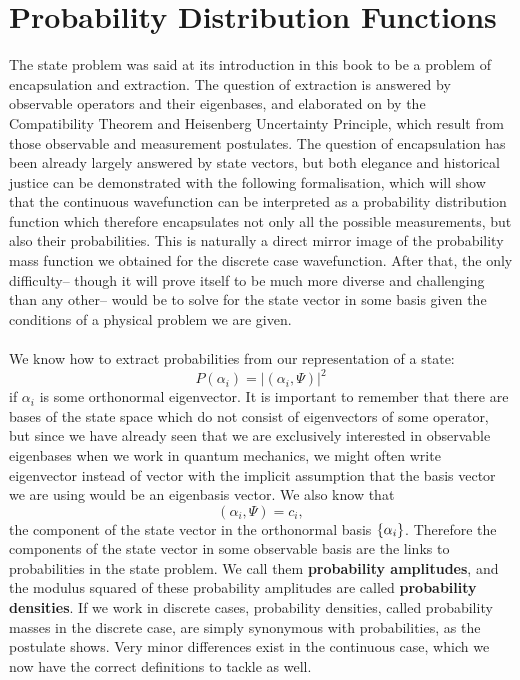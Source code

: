 \section{Probability Distribution Functions}
The state problem was said at its introduction in this book to be a problem of encapsulation and extraction. The question of extraction is answered by observable operators and their eigenbases, and elaborated on by the Compatibility Theorem and Heisenberg Uncertainty Principle, which result from those observable and measurement postulates. The question of encapsulation has been already largely answered by state vectors, but both elegance and historical justice can be demonstrated with the following formalisation, which will show that the continuous wavefunction can be interpreted as a probability distribution function which therefore encapsulates not only all the possible measurements, but also their probabilities. This is naturally a direct mirror image of the probability mass function we obtained for the discrete case wavefunction. After that, the only difficulty-- though it will prove itself to be much more diverse and challenging than any other-- would be to solve for the state vector in some basis given the conditions of a physical problem we are given.
\\\\
We know how to extract probabilities from our representation of a state:
$$
P(\alpha_{i})=|(\alpha_{i},\Psi)|^{2}
$$
if $\alpha_{i}$ is some orthonormal eigenvector. It is important to remember that there are bases of the state space which do not consist of eigenvectors of some operator, but since we have already seen that we are exclusively interested in observable eigenbases when we work in quantum mechanics, we might often write eigenvector instead of vector with the implicit assumption that the basis vector we are using would be an eigenbasis vector. We also know that 
$$
(\alpha_{i},\Psi)=c_{i},
$$
the component of the state vector in the orthonormal basis $\{\alpha_{i}\}$. Therefore the components of the state vector in some observable basis are the links to probabilities in the state problem. We call them \textbf{probability amplitudes}, and the modulus squared of these probability amplitudes are called \textbf{probability densities}. If we work in discrete cases, probability densities, called probability masses in the discrete case, are simply synonymous with probabilities, as the postulate shows. Very minor differences exist in the continuous case, which we now have the correct definitions to tackle as well.
